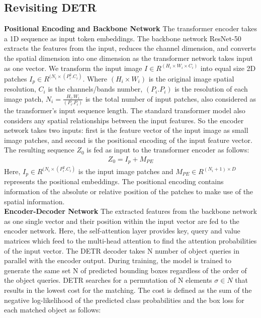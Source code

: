 \documentclass[sn-mathphys]{sn-jnl}\jyear{2021}\theoremstyle{thmstyleone}\newtheorem{theorem}{Theorem}\newtheorem{proposition}[theorem]{Proposition}\theoremstyle{thmstyletwo}\newtheorem{example}{Example}\newtheorem{remark}{Remark}\theoremstyle{thmstylethree}\newtheorem{definition}{Definition}\usepackage{amsmath}
\begin{document}
\subsection{Revisiting DETR}
\noindent\textbf {Positional Encoding and Backbone Network}
The transformer encoder takes a 1D sequence as input token embeddings. The backbone network ResNet-50 \cite{resnet45} extracts the features from the input, reduces the channel dimension, and converts the spatial dimension into one dimension as the transformer network takes input as one vector. We transform the input image $I\in R^{(H_i\times W_i\times C_i)}$ into equal size 2D patches $I_p\in R^{(N_i\times (P_i^2.C_i)}$. Where $ (H_i \times W_i)$ is the original image spatial resolution, $C_i$ is the channels/bands number, $(P_i.P_i)$ is the resolution of each image patch, $N_i= \frac{H_i.W_i}{(P_i.P_i)}$ is the total number of input patches, also considered as the transformer's input sequence length. The standard transformer model also considers any spatial relationships between the input features. So the encoder network takes two inputs: first is the feature vector of the input image as small image patches, and second is the positional encoding of the input feature vector. The resulting sequence $Z_0$ is fed as input to the transformer encoder as follows: 
\setlength{\abovedisplayskip}{3pt}
\setlength{\belowdisplayskip}{3pt}
\begin{align}
Z_0 = I_p + M_{PE} \label{eq3} 
\end{align}
Here, $I_p \in R^{(N_i \times (P_i^2.C_i)}$ is the input image patches and $M_{PE} \in R^{(N_i+1) \times D}$ represents the positional embeddings. The positional encoding contains information of the absolute or relative position of the patches to make use of the spatial information. \\
\noindent\textbf {Encoder-Decoder Network} The extracted features from the backbone network as one single vector and their position within the input vector are fed to the encoder network. Here, the self-attention layer provides key, query and value matrices which feed to the multi-head attention to find the attention probabilities of the input vector. The DETR decoder takes N number of object queries in parallel with the encoder output. During training, the model is trained to generate the same set N of predicted bounding boxes regardless of the order of the object queries. DETR searches for a permutation of N elements $\sigma \in N$ that results in the lowest cost for the matching. The cost is defined as the sum of the negative log-likelihood of the predicted class probabilities and the box loss for each matched object as follows:
\end{document}

